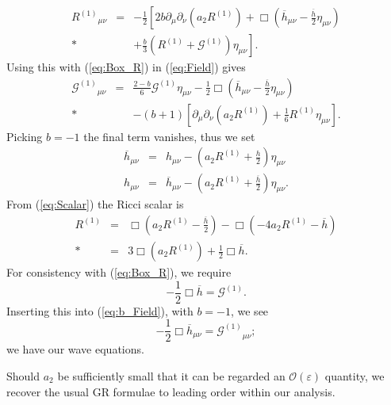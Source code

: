 \documentclass[aps,prd,amsfonts,amssymb,amsmath,nofootinbib,reprint,showpacs]{revtex4-1}
\newcommand{\eqnref}[1]{(\ref{eq:#1})}
\newcommand{\recip}[1]{\ensuremath{\frac{1}{#1}}}
\newcommand{\order}[1]{\ensuremath{\mathcal{O}({#1})}}
\begin{document}
\begin{eqnarray}
{R^{(1)}}_{\mu\nu} & = & -\frac{1}{2}\left[2b \partial_\mu\partial_\nu(a_2  R^{(1)}) + \Box\left(\overline{h}_{\mu\nu} -\frac{\overline{h}}{2}\eta_{\mu\nu}\right) \right. \nonumber \\*
 & &  +\left . \frac{b}{3}(R^{(1)} + \mathcal{G}^{(1)})\eta_{\mu\nu}\right].
\label{eq:new_Ricci}
\end{eqnarray}
Using this with \eqnref{Box_R} in \eqnref{Field} gives
\begin{eqnarray}
{\mathcal{G}^{(1)}}_{\mu\nu} & = & \frac{2 - b}{6}\mathcal{G}^{(1)}\eta_{\mu\nu} -\frac{1}{2}\Box\left(\overline{h}_{\mu\nu} - \frac{\overline{h}}{2}\eta_{\mu\nu}\right) \nonumber \\*
 & & - (b + 1)\left[\partial_\mu\partial_\nu(a_2 R^{(1)}) + \recip{6}R^{(1)}\eta_{\mu\nu}\right].
\label{eq:b_Field}
\end{eqnarray}
Picking $b = -1$ the final term vanishes, thus we set~\cite{Corda2008, Capozziello2008}
\begin{subequations}
\begin{eqnarray}
\label{eq:hbar_metric}
\overline{h}_{\mu\nu} & = & h_{\mu\nu} - \left(a_2 R^{(1)} + \frac{h}{2}\right)\eta_{\mu\nu}\\
h_{\mu\nu} & = & \overline{h}_{\mu\nu} - \left(a_2 R^{(1)} + \frac{\overline{h}}{2}\right)\eta_{\mu\nu}.
\label{eq:h_metric}
\end{eqnarray}
\end{subequations}
From \eqnref{Scalar} the Ricci scalar is 
\begin{eqnarray}
R^{(1)} & = & \Box \left(a_2 R^{(1)} -\frac{\overline{h}}{2}\right) - \Box (-4 a_2 R^{(1)} - \overline{h}) \nonumber \\*
 & = & 3 \Box(a_2 R^{(1)}) + \frac{1}{2}\Box \overline{h}.
\label{eq:Ricci_Box_h}
\end{eqnarray}
For consistency with \eqnref{Box_R}, we require
\begin{equation}
-\recip{2}\Box \overline{h} = \mathcal{G}^{(1)}.
\label{eq:Box_h}
\end{equation}
Inserting this into \eqnref{b_Field}, with $b = -1$, we see
\begin{equation}
-\recip{2}\Box \overline{h}_{\mu\nu} = {\mathcal{G}^{(1)}}_{\mu\nu};
\label{eq:Box_hmunu}
\end{equation}
we have our wave equations.

Should $a_2$ be sufficiently small that it can be regarded an $\order{\varepsilon}$ quantity, we recover the usual GR formulae to leading order within our analysis.
\end{document}

